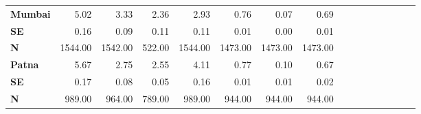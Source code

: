 \begin{tabular}{@{\extracolsep{5pt}}lrrrrrrrrrrrrrrr}
{\bf Mumbai} & 5.02\phantom{***} & 3.33\phantom{***} & 2.36\phantom{***} & 2.93\phantom{***} & 0.76\phantom{***} & 0.07\phantom{***} & 0.69\phantom{***} \\
{\bf SE} & 0.16\phantom{***} & 0.09\phantom{***} & 0.11\phantom{***} & 0.11\phantom{***} & 0.01\phantom{***} & 0.00\phantom{***} & 0.01\phantom{***} \\
{\bf N} & 1544.00\phantom{***} & 1542.00\phantom{***} & 522.00\phantom{***} & 1544.00\phantom{***} & 1473.00\phantom{***} & 1473.00\phantom{***} & 1473.00\phantom{***} \\
{\bf Patna} & 5.67\phantom{***} & 2.75\phantom{***} & 2.55\phantom{***} & 4.11\phantom{***} & 0.77\phantom{***} & 0.10\phantom{***} & 0.67\phantom{***} \\
{\bf SE} & 0.17\phantom{***} & 0.08\phantom{***} & 0.05\phantom{***} & 0.16\phantom{***} & 0.01\phantom{***} & 0.01\phantom{***} & 0.02\phantom{***} \\
{\bf N} & 989.00\phantom{***} & 964.00\phantom{***} & 789.00\phantom{***} & 989.00\phantom{***} & 944.00\phantom{***} & 944.00\phantom{***} & 944.00\phantom{***} \\
\hline
\end{tabular}
